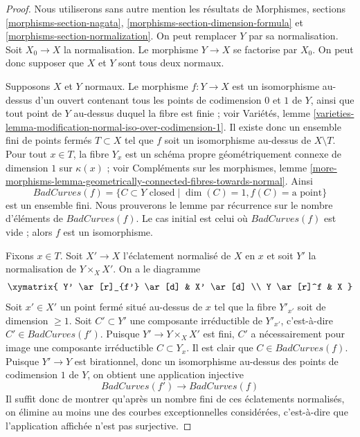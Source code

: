 \begin{proof} Nous utiliserons sans autre mention les résultats de Morphismes, sections \ref{morphisms-section-nagata}, \ref{morphisms-section-dimension-formula} et \ref{morphisms-section-normalization}. On peut remplacer $Y$ par sa normalisation. Soit $X_0 \to X$ la normalisation. Le morphisme $Y \to X$ se factorise par $X_0$. On peut donc supposer que $X$ et $Y$ sont tous deux normaux.

\medskip\noindent Supposons $X$ et $Y$ normaux. Le morphisme $f : Y \to X$ est un isomorphisme au-dessus d'un ouvert contenant tous les points de codimension $0$ et $1$ de $Y$, ainsi que tout point de $Y$ au-dessus duquel la fibre est finie ; voir Variétés, lemme \ref{varieties-lemma-modification-normal-iso-over-codimension-1}. Il existe donc un ensemble fini de points fermés $T \subset X$ tel que $f$ soit un isomorphisme au-dessus de $X \setminus T$. Pour tout $x \in T$, la fibre $Y_x$ est un schéma propre géométriquement connexe de dimension $1$ sur $\kappa(x)$ ; voir Compléments sur les morphismes, lemme \ref{more-morphisms-lemma-geometrically-connected-fibres-towards-normal}. Ainsi $$
BadCurves(f) = \{C \subset Y\text{ closed} \mid
\dim(C) = 1, f(C) = \text{a point}\}
$$ est un ensemble fini. Nous prouverons le lemme par récurrence sur le nombre d'éléments de $BadCurves(f)$. Le cas initial est celui où $BadCurves(f)$ est vide ; alors $f$ est un isomorphisme.

\medskip\noindent Fixons $x \in T$. Soit $X' \to X$ l'éclatement normalisé de $X$ en $x$ et soit $Y'$ la normalisation de $Y \times_X X'$. On a le diagramme $$
\xymatrix{
Y' \ar[r]_{f'} \ar[d] & X' \ar[d] \\
Y \ar[r]^f & X
}
$$ Soit $x' \in X'$ un point fermé situé au-dessus de $x$ tel que la fibre $Y'_{x'}$ soit de dimension $\geq 1$. Soit $C' \subset Y'$ une composante irréductible de $Y'_{x'}$, c'est-à-dire $C' \in BadCurves(f')$. Puisque $Y' \to Y \times_X X'$ est fini, $C'$ a nécessairement pour image une composante irréductible $C \subset Y_x$. Il est clair que $C \in BadCurves(f)$. Puisque $Y' \to Y$ est birationnel, donc un isomorphisme au-dessus des points de codimension $1$ de $Y$, on obtient une application injective $$
BadCurves(f') \longrightarrow BadCurves(f)
$$ Il suffit donc de montrer qu'après un nombre fini de ces éclatements normalisés, on élimine au moins une des courbes exceptionnelles considérées, c'est-à-dire que l'application affichée n'est pas surjective.


\end{proof}

